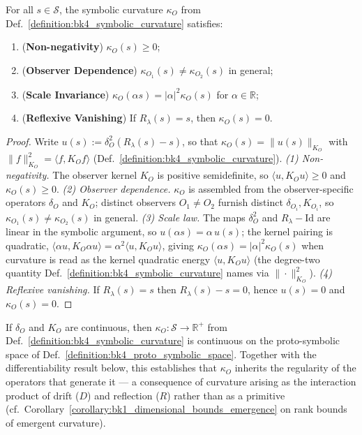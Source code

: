 \begin{theorem}
\label{theorem:bk4_symbolic_curvature_properties}
For all $s \in \mathcal{S}$, the symbolic curvature $\kappa_O$ from Def.~\ref{definition:bk4_symbolic_curvature} satisfies:
\begin{enumerate}
    \item (\textbf{Non-negativity}) $\kappa_O(s) \geq 0$;
    \item (\textbf{Observer Dependence}) $\kappa_{O_1}(s) \ne \kappa_{O_2}(s)$ in general;
    \item (\textbf{Scale Invariance}) $\kappa_O(\alpha s) = |\alpha|^2 \kappa_O(s)$ for $\alpha \in \mathbb{R}$;
    \item (\textbf{Reflexive Vanishing}) If $R_\lambda(s) = s$, then $\kappa_O(s) = 0$.
\end{enumerate}
\end{theorem}

\begin{proof}
\label{proof:bk4_symbolic_curvature_properties}
\leavevmode
Write $u(s) := \delta_O^2(R_\lambda(s) - s)$, so that $\kappa_O(s) = \|u(s)\|_{K_O}$ with $\|f\|_{K_O}^2 = \langle f, K_O f\rangle$ (Def.~\ref{definition:bk4_symbolic_curvature}).
\emph{(1) Non-negativity.} The observer kernel $K_O$ is positive semidefinite, so $\langle u, K_O u\rangle \ge 0$ and $\kappa_O(s) \ge 0$.
\emph{(2) Observer dependence.} $\kappa_O$ is assembled from the observer-specific operators $\delta_O$ and $K_O$; distinct observers $O_1 \neq O_2$ furnish distinct $\delta_{O_i}, K_{O_i}$, so $\kappa_{O_1}(s) \neq \kappa_{O_2}(s)$ in general.
\emph{(3) Scale law.} The maps $\delta_O^2$ and $R_\lambda - \mathrm{Id}$ are linear in the symbolic argument, so $u(\alpha s) = \alpha\,u(s)$; the kernel pairing is quadratic, $\langle \alpha u, K_O \alpha u\rangle = \alpha^2 \langle u, K_O u\rangle$, giving $\kappa_O(\alpha s) = |\alpha|^2 \kappa_O(s)$ when curvature is read as the kernel quadratic energy $\langle u, K_O u\rangle$ (the degree-two quantity Def.~\ref{definition:bk4_symbolic_curvature} names via $\|\cdot\|_{K_O}^2$).
\emph{(4) Reflexive vanishing.} If $R_\lambda(s) = s$ then $R_\lambda(s) - s = 0$, hence $u(s) = 0$ and $\kappa_O(s) = 0$.
\end{proof}

\begin{theorem}[Continuity]
\label{theorem:bk4_curvature_continuity}
If $\delta_O$ and $K_O$ are continuous, then $\kappa_O : \mathcal{S} \to \mathbb{R}^+$ from Def.~\ref{definition:bk4_symbolic_curvature} is continuous on the proto-symbolic space of Def.~\ref{definition:bk4_proto_symbolic_space}. Together with the differentiability result below, this establishes that $\kappa_O$ inherits the regularity of the operators that generate it --- a consequence of curvature arising as the interaction product of drift ($D$) and reflection ($R$) rather than as a primitive (cf.~Corollary~\ref{corollary:bk1_dimensional_bounds_emergence} on rank bounds of emergent curvature).
\end{theorem}

